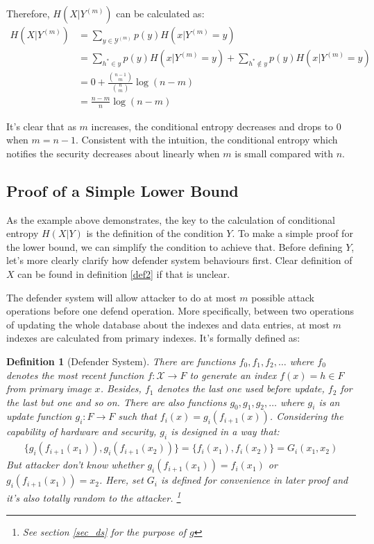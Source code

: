 \documentclass[10pt,a4paper]{article}
\newtheorem{mydef}{Definition}
\begin{document}
		Therefore, $H(X | Y^{(m)})$ can be calculated as:
		\begin{align*}
			H(X | Y^{(m)}) &= \sum_{y \in \mathcal Y^{(m)}} p(y) H(x | Y^{(m)} = y)\\
				&= \sum_{h^* \in y} p(y) H(x | Y^{(m)} = y) + \sum_{h^* \notin y} p(y) H(x | Y^{(m)} = y)\\
				&= 0+\frac{\binom{n-1}{m}}{\binom{n}{m}} \log(n-m)\\
				&= \frac{n-m}{n} \log(n-m)
		\end{align*}
		
		It's clear that as $m$ increases, 
		the conditional entropy decreases and drops to $0$ when $m = n-1$. 
		Consistent with the intuition, the conditional
		entropy which notifies the security decreases about linearly when $m$ is small 
		compared with $n$.
		
	\subsection{Proof of a Simple Lower Bound}
		As the example above demonstrates, the key to the calculation
		of conditional entropy $H(X|Y)$ is the definition of the condition $Y$.
		To make a simple proof for the lower bound, we can simplify the
		condition to achieve that. Before defining $Y$, let's
		more clearly clarify how defender system behaviours first. Clear
		definition of $X$ can be found in definition \ref{def2}
		if that is unclear.
		
		The defender system will allow attacker to do at most $m$ possible
		attack operations before one defend operation. More specifically, between
		two operations of updating the whole database about the indexes and data entries,
		at most $m$ indexes are calculated from primary indexes. It's formally defined
		as:
		\begin{mydef}[Defender System]
			There are functions $f_0, f_1, f_2, \ldots$ where
			$f_0$ denotes the most recent function $f: \mathcal{X} \rightarrow F$
			to generate an index $f(x) = h \in F$ from primary image $x$. 
			Besides, $f_1$ denotes the last one used before update, $f_2$ for the last but one and so on.
			There are also functions $g_0, g_1, g_2, \ldots$ where
			$g_i$ is an update function $g_i: F \rightarrow F$ such that
			$f_i(x) = g_i(f_{i+1}(x))$. Considering the capability of hardware and security,
			$g_i$ is designed in a way that:
			\begin{align*}
				\{g_i(f_{i+1}(x_1)), g_i(f_{i+1}(x_2))\} = \{ f_i(x_1), f_i(x_2)\} = G_i(x_1, x_2)
			\end{align*}
			But attacker don't know whether $g_i(f_{i+1}(x_1)) = f_i(x_1)$ or
			$g_i(f_{i+1}(x_1)) = x_2$. 
			Here, set $G_i$ is defined for convenience in later proof and
			it's also totally random
			to the attacker. \footnote{See section \ref{sec_ds} for the purpose
			of $g$}
		\end{mydef}
		
\end{document}
